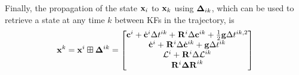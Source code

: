 Finally, the propagation of the state ${\bf x}_i$ to ${\bf x}_k$ using ${{\bm \Delta}}_{ik}$, which can be used to retrieve a state at any time $k$ between KFs in the trajectory, is
%
\begin{equation}
	{\bf x}^k = {\bf x}^i \boxplus {{\bm \Delta}}^{ik} =
	\begin{bmatrix}
	{\bf c}^i + \dot{{\bf c}}^i \Delta t^{ik} + \prescript{}{}{{\bf R}}_{}^i \Delta {\bf c}^{ik} + \frac{1}{2} {\bf g} \Delta t^{ik,2}
	\\
	\dot{{\bf c}}^i + \prescript{}{}{{\bf R}}_{}^i \Delta \dot{{\bf c}}^{ik} + {\bf g} \Delta t^{ik}
	\\
	\mathcal{L}^i + \prescript{}{}{{\bf R}}_{}^i \Delta \mathcal{L}^{ik}
	\\
	\prescript{}{}{{\bf R}}_{}^i {\bm \Delta {\bf R}}^{ik}
	\end{bmatrix}
\end{equation}


